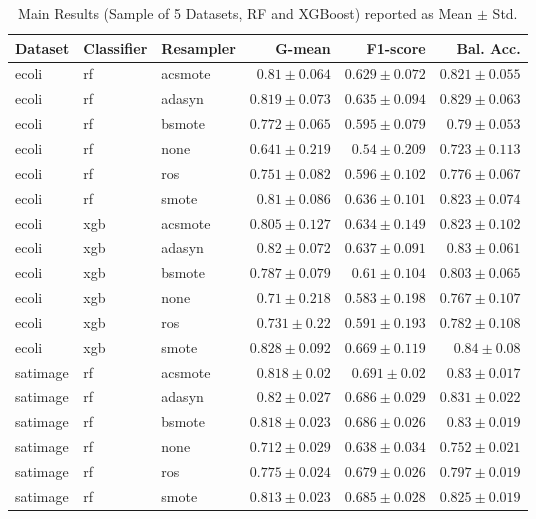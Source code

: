 \documentclass[conference,a4paper]{IEEEtran}
\begin{document}
\begin{table}[htbp]
\caption{Main Results (Sample of 5 Datasets, RF and XGBoost) reported as Mean $\pm$ Std.}
\label{tab:results}
\centering
\begin{tabular}{lllrrr}
\toprule
\textbf{Dataset} & \textbf{Classifier} & \textbf{Resampler} & \textbf{G-mean} & \textbf{F1-score} & \textbf{Bal. Acc.} \\
\midrule
ecoli & rf & acsmote & $0.81 \pm 0.064$ & $0.629 \pm 0.072$ & $0.821 \pm 0.055$ \\
ecoli & rf & adasyn & $0.819 \pm 0.073$ & $0.635 \pm 0.094$ & $0.829 \pm 0.063$ \\
ecoli & rf & bsmote & $0.772 \pm 0.065$ & $0.595 \pm 0.079$ & $0.79 \pm 0.053$ \\
ecoli & rf & none & $0.641 \pm 0.219$ & $0.54 \pm 0.209$ & $0.723 \pm 0.113$ \\
ecoli & rf & ros & $0.751 \pm 0.082$ & $0.596 \pm 0.102$ & $0.776 \pm 0.067$ \\
ecoli & rf & smote & $0.81 \pm 0.086$ & $0.636 \pm 0.101$ & $0.823 \pm 0.074$ \\
ecoli & xgb & acsmote & $0.805 \pm 0.127$ & $0.634 \pm 0.149$ & $0.823 \pm 0.102$ \\
ecoli & xgb & adasyn & $0.82 \pm 0.072$ & $0.637 \pm 0.091$ & $0.83 \pm 0.061$ \\
ecoli & xgb & bsmote & $0.787 \pm 0.079$ & $0.61 \pm 0.104$ & $0.803 \pm 0.065$ \\
ecoli & xgb & none & $0.71 \pm 0.218$ & $0.583 \pm 0.198$ & $0.767 \pm 0.107$ \\
ecoli & xgb & ros & $0.731 \pm 0.22$ & $0.591 \pm 0.193$ & $0.782 \pm 0.108$ \\
ecoli & xgb & smote & $0.828 \pm 0.092$ & $0.669 \pm 0.119$ & $0.84 \pm 0.08$ \\
satimage & rf & acsmote & $0.818 \pm 0.02$ & $0.691 \pm 0.02$ & $0.83 \pm 0.017$ \\
satimage & rf & adasyn & $0.82 \pm 0.027$ & $0.686 \pm 0.029$ & $0.831 \pm 0.022$ \\
satimage & rf & bsmote & $0.818 \pm 0.023$ & $0.686 \pm 0.026$ & $0.83 \pm 0.019$ \\
satimage & rf & none & $0.712 \pm 0.029$ & $0.638 \pm 0.034$ & $0.752 \pm 0.021$ \\
satimage & rf & ros & $0.775 \pm 0.024$ & $0.679 \pm 0.026$ & $0.797 \pm 0.019$ \\
satimage & rf & smote & $0.813 \pm 0.023$ & $0.685 \pm 0.028$ & $0.825 \pm 0.019$ \\

\end{tabular}
\end{table}
\end{document}
